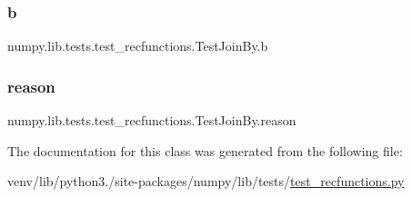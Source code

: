 \subsubsection{\texorpdfstring{b}{b}}
{\footnotesize\ttfamily numpy.\+lib.\+tests.\+test\+\_\+recfunctions.\+Test\+Join\+By.\+b}

\mbox{\label{classnumpy_1_1lib_1_1tests_1_1test__recfunctions_1_1TestJoinBy_a4227dd8b17e924fa1dc202e20ed685b8}} 
\subsubsection{\texorpdfstring{reason}{reason}}
{\footnotesize\ttfamily numpy.\+lib.\+tests.\+test\+\_\+recfunctions.\+Test\+Join\+By.\+reason\hspace{0.3cm}{\ttfamily [static]}}



The documentation for this class was generated from the following file\+:\begin{DoxyCompactItemize}
\item 
venv/lib/python3./site-\/packages/numpy/lib/tests/\hyperlink{test__recfunctions_8py}{test\+\_\+recfunctions.\+py}\end{DoxyCompactItemize}
